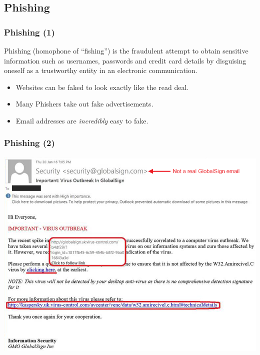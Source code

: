 \documentclass[aspectratio=1610,dvipsnames]{beamer}
\begin{document}
\subsection{Phishing}

\begin{frame}
\frametitle{Phishing (1)}
Phishing (homophone of ``fishing'') is the fraudulent attempt to obtain sensitive information such as usernames, passwords and credit card details by disguising oneself as a trustworthy entity in an electronic communication.
\pause\bigskip

\begin{itemize}
\pause\item Websites can be faked to look exactly like the read deal.
\pause\item Many Phishers take out fake advertisements.
\pause\item Email addresses are \emph{incredibly} easy to fake.
\end{itemize}
\end{frame}

\begin{frame}
\frametitle{Phishing (2)}
\begin{center}
\includegraphics[scale=0.45]{images/phishing.png} 
\end{center}
\end{frame}
\end{document}
